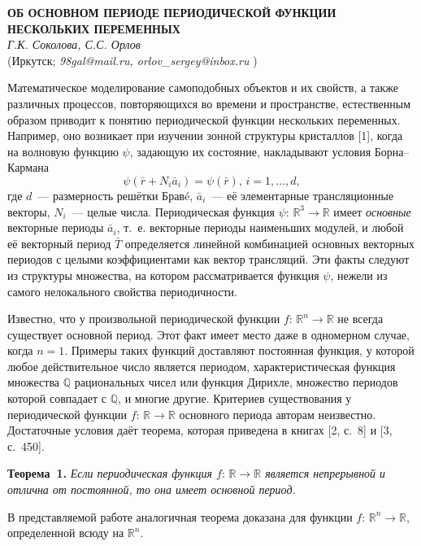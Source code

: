\begin{center}{ \bf ОБ ОСНОВНОМ ПЕРИОДЕ ПЕРИОДИЧЕСКОЙ ФУНКЦИИ НЕСКОЛЬКИХ ПЕРЕМЕННЫХ}\\
{\it Г.К. Соколова, С.С. Орлов } \\
(Иркутск; {\it 98gal@mail.ru, orlov{\_}sergey@inbox.ru} )
\end{center}

Математическое моделирование самоподобных объектов и их свойств, а также различных процессов, повторяющихся во времени и пространстве, естественным образом приводит к понятию  периодической функции нескольких переменных. Например, оно возникает при изучении  зонной структуры кристаллов [1], когда на волновую функцию
$\psi$, задающую их состояние, накладывают условия Борна--Кармана
$$
\psi(\bar{r}+N_{i}\bar{a}_{i})=\psi(\bar{r}),\,i=1,\ldots,d,
$$
где $d$~--- размерность решётки Брав{\'e},
$\bar{a}_{i}$~--- её элементарные трансляционные векторы,
$N_{i}$~--- целые числа.
Периодическая функция $\psi:\,{\mathbb R}^{3}\to{\mathbb R}$ имеет {\it основные} векторные периоды $\bar{a}_{i}$,
т.~е. векторные периоды наименьших модулей,
и любой её векторный период $\bar{T}$ определяется линейной комбинацией основных векторных периодов с целыми коэффициентами
как вектор трансляций.
Эти факты следуют из структуры множества, на котором рассматривается функция $\psi$,
нежели из самого нелокального свойства периодичности.

Известно, что у произвольной периодической функции $f:\,{\mathbb R}^{n}\to{\mathbb R}$ не всегда существует основной период. Этот факт имеет место даже в одномерном случае, когда $n=1$. Примеры таких функций  доставляют  постоянная функция, у которой любое действительное число является периодом, характеристическая функция множества ${\mathbb Q}$ рациональных чисел или функция Дирихле, множество периодов которой совпадает с ${\mathbb Q}$, и многие другие. Критериев существования у периодической функции $f:\,{\mathbb R}\to {\mathbb R}$ основного периода авторам неизвестно. Достаточные условия даёт теорема, которая приведена в книгах [2, с.~8] и [3, с.~450].

\textbf{Теорема~1.} {\it Если периодическая функция $f:\,{\mathbb R}\to {\mathbb R}$ является непрерывной и отлична от постоянной, то она имеет основной период.}

В представляемой работе аналогичная теорема доказана для функции  $f:\,{\mathbb R}^{n}\to {\mathbb R}$, определенной всюду на ${\mathbb R}^{n}$.

